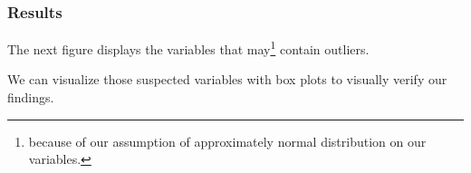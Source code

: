 \documentclass[11pt]{article}
\begin{document}
			\subsubsection*{Results}
				The next figure displays the variables that may\footnote{because of our assumption of approximately normal distribution on our variables.} contain outliers.

				We can visualize those suspected variables with box plots to visually verify our findings.
				\iffalse
\end{document}
